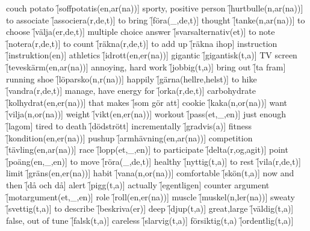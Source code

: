 \begin{questions}
    \begin{multicols}{2}
        \raggedcolumns
        \question couch potato \f[soffpotatis(en,ar(na))]
        \question sporty, positive person \f[hurtbulle(n,ar(na))]
        \question to associate \f[associera(r,de,t)]
        \question to bring \f[föra(\_,de,t)]
        \question thought \f[tanke(n,ar(na))]
        \question to choose \f[välja(er,de,t)]
        \question multiple choice answer \f[svarsalternativ(et)]
        \question to note \f[notera(r,de,t)]
        \question to count \f[räkna(r,de,t)]
        \question to add up \f[räkna ihop]
        \question instruction \f[instruktion(en)]
        \question athletics \f[idrott(en,er(na))]
        \question gigantic \f[gigantisk(t,a)]
        \question TV screen \f[teveskärm(en,ar(na))]
        \question annoying, hard work \f[jobbig(t,a)]
        \question bring out \f[ta fram]
        \question running shoe \f[löparsko(n,r(na))]
        \question happily \f[gärna(hellre,helst)]
        \question to hike \f[vandra(r,de,t)]
        \question manage, have energy for \f[orka(r,de,t)]
        \question carbohydrate \f[kolhydrat(en,er(na))]
        \question that makes \f[som gör att]
        \question cookie \f[kaka(n,or(na))]
        \question want \f[vilja(n,or(na))]
        \question weight \f[vikt(en,er(na))]
        \question workout \f[pass(et,\_,en)]
        \question just enough \f[lagom]
        \question tired to death \f[dödstrött]
        \question incrementally \f[gradvis(a)]
        \question fitness \f[kondition(en,er(na))]
        \question pushup \f[armhävning(en,ar(na))]
        \question competition \f[tävling(en,ar(na))]
        \question race \f[lopp(et,\_,en)]
        \question to participate \f[delta(r,og,agit)]
        \question point \f[poäng(en,\_,en)]
        \question to move \f[röra(\_,de,t)]
        \question healthy \f[nyttig(t,a)]
        \question to rest \f[vila(r,de,t)]
        \question limit \f[gräns(en,er(na))]
        \question habit \f[vana(n,or(na))]
        \question comfortable \f[skön(t,a)]
        \question now and then \f[då och då]
        \question alert \f[pigg(t,a)]
        \question actually \f[egentligen]
        \question counter argument \f[motargument(et,\_,en)]
        \question role \f[roll(en,er(na))]
        \question muscle \f[muskel(n,ler(na))]
        \question sweaty \f[svettig(t,a)]
        \question to describe \f[beskriva(er)]
        \question deep \f[djup(t,a)]
        \question great,large \f[väldig(t,a)]
        \question false, out of tune \f[falsk(t,a)]
        \question careless \f[slarvig(t,a)]
        \question försiktig(t,a) \f[ordentlig(t,a)]
    \end{multicols}
\end{questions}
